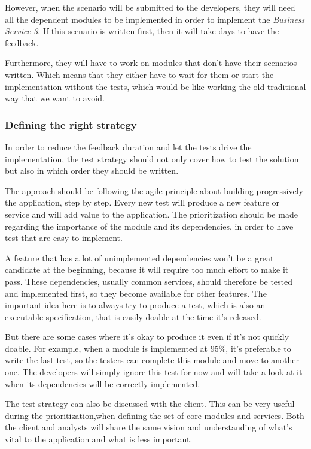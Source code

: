 However, when the scenario will be submitted to the developers, they will
need all the dependent modules to be implemented in order to implement the
\textit{Business Service 3}.
If this scenario is written first, then it will take days to have the feedback.

Furthermore, they will have to work on modules that don't have their
scenarios written.
Which means that they either have to wait for them or start the
implementation without the tests, which would be like working the old
traditional way that we want to avoid.

\subsubsection{Defining the right strategy}
In order to reduce the feedback duration and let the tests drive the
implementation, the test strategy should not only cover how to test the
solution but also in which order they should be written.

The approach should be following the agile principle about building
progressively the application, step by step.
Every new test will produce a new feature or service and will add value
to the application.
The prioritization should be made regarding the importance of the module and
its dependencies, in order to have test that are easy to implement.

A feature that has a lot of unimplemented dependencies won't be a great
candidate at the beginning, because it will require too much effort to make
it pass.
These dependencies, usually common services, should therefore be tested
and implemented first, so they become available for other features.
The important idea here is to always try to produce a test, which is also an
executable specification, that is easily doable at the time it's released.

But there are some cases where it's okay to produce it even if it's not
quickly doable.
For example, when a module is implemented at 95\%, it's preferable to write
the last test, so the testers can complete this module and move to another one.
The developers will simply ignore this test for now and will take a look at
it when its dependencies will be correctly implemented.

The test strategy can also be discussed with the client.
This can be very useful during the prioritization,when defining the set of
core modules and services.
Both the client and analysts will share the same vision and understanding of
what's vital to the application and what is less important.


